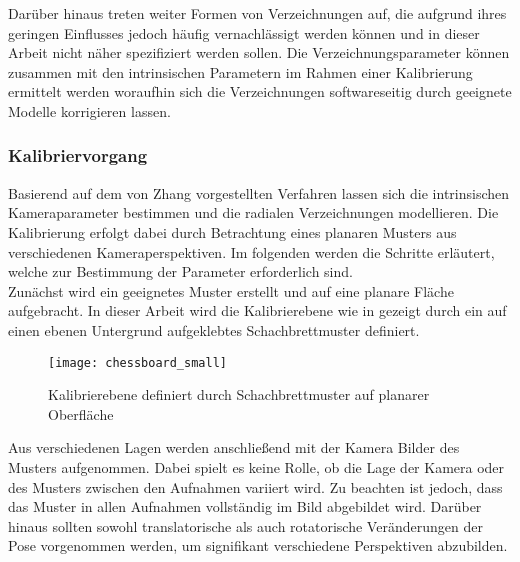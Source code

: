 
Darüber hinaus treten weiter Formen von Verzeichnungen auf, die aufgrund ihres geringen Einflusses jedoch häufig vernachlässigt werden können und in dieser Arbeit nicht näher spezifiziert werden sollen. Die Verzeichnungsparameter können zusammen mit den intrinsischen Parametern im Rahmen einer Kalibrierung ermittelt werden woraufhin sich die Verzeichnungen softwareseitig durch geeignete Modelle korrigieren lassen. 

\subsubsection{Kalibriervorgang}
Basierend auf dem von Zhang \cite{Zhang2000} vorgestellten Verfahren lassen sich die intrinsischen Kameraparameter bestimmen und die radialen Verzeichnungen modellieren. Die Kalibrierung erfolgt dabei durch Betrachtung eines planaren Musters aus verschiedenen Kameraperspektiven. Im folgenden werden die Schritte erläutert, welche zur Bestimmung der Parameter erforderlich sind.\\

Zunächst wird ein geeignetes Muster erstellt und auf eine planare Fläche aufgebracht. In dieser Arbeit wird die Kalibrierebene wie in  gezeigt durch ein auf einen ebenen Untergrund aufgeklebtes Schachbrettmuster definiert.

\begin{figure}[ht]
	\begin{center}
		\texttt{[image: chessboard\_small]}
		\caption{Kalibrierebene definiert durch Schachbrettmuster auf planarer Oberfläche}
		\label{fig.chesscalib}
	\end{center}
\end{figure}

Aus verschiedenen Lagen werden anschließend mit der Kamera Bilder des Musters aufgenommen. Dabei spielt es keine Rolle, ob die Lage der Kamera oder des Musters zwischen den Aufnahmen variiert wird. Zu beachten ist jedoch, dass das Muster in allen Aufnahmen vollständig im Bild abgebildet wird. Darüber hinaus sollten sowohl translatorische als auch rotatorische Veränderungen der Pose vorgenommen werden, um signifikant verschiedene Perspektiven abzubilden.\\

